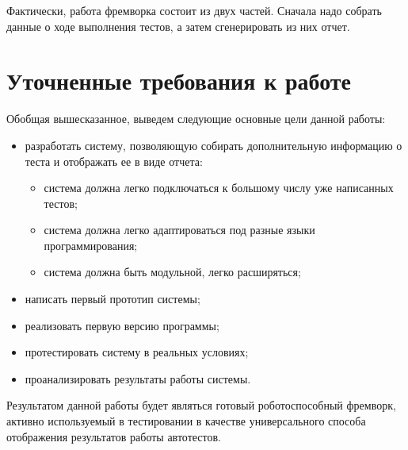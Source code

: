 Фактически, работа фремворка состоит из двух частей. Сначала надо собрать данные о ходе выполнения тестов, а затем сгенерировать из них отчет. 

\section{Уточненные требования к работе}

Обобщая вышесказанное, выведем следующие основные цели данной работы:

\begin{itemize}
\item разработать систему, позволяющую собирать дополнительную информацию о теста и отображать ее в виде отчета:
\begin{itemize}
\item система должна легко подключаться к большому числу уже написанных тестов;
\item система должна легко адаптироваться под разные языки программирования;
\item система должна быть модульной, легко расширяться;
\end{itemize}
\item написать первый прототип системы;
\item реализовать первую версию программы;
\item протестировать систему в реальных условиях;
\item проанализировать результаты работы системы.
\end{itemize}

Результатом данной работы будет являться готовый роботоспособный фремворк, активно используемый в тестировании в качестве универсального способа
отображения результатов работы автотестов.
